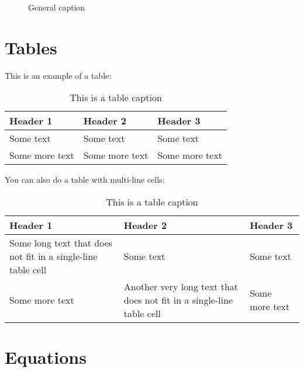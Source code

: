 \begin{figure}[htbp!]
\centering
{}
\caption{General caption} 
\label{fig:figure4_5_label}
\end{figure}

\section{Tables}

This is an example of a table:

\begin{table}[H]
\centering
\caption{This is a table caption}
\label{tab:table1_label}
\begin{tabular}{|l|l|l|} %
\hline %
\textbf{Header 1} & \textbf{Header 2} & \textbf{Header 3}\\ %
\hline 
Some text & Some text & Some text\\
Some more text & Some more text & Some more text\\
\hline
\end{tabular}
\end{table}

You can also do a table with multi-line cells:

\begin{table}[H]
\centering
\caption{This is a table caption}
\label{tab:table2_label}
\begin{tabular}{|p{}p{}p{}|}
\hline
\textbf{Header 1} &  \textbf{Header 2} & \textbf{Header 3}\\ 
\hline
Some long text that does not fit in a single-line table cell & Some text & Some text \\
Some more text & Another very long text that does not fit in a single-line table cell & Some more text\\
\hline
\end{tabular}
\end{table}

\section{Equations}

